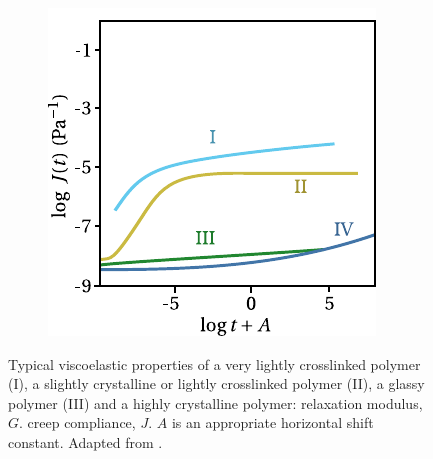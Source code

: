 \begin{figure}[hbtp]
\begin{subfigure}[b]{0.45\textwidth}
                            \includegraphics[width=\textwidth]{figures/creep_compliance_scp}
                            \caption{}
                            \label{subfig:creep_compliance_scp}
            \end{subfigure}
    \caption{Typical viscoelastic properties of a very lightly crosslinked polymer (I), a slightly crystalline or lightly crosslinked polymer (II), a glassy polymer (III) and a highly crystalline polymer:  relaxation modulus, $G$.  creep compliance, $J$. $A$ is an appropriate horizontal shift constant. Adapted from \cite{ferryViscoelasticPropertiesPolymers1980}.}
\label{fig:relax_creep_scp}
\end{figure}

